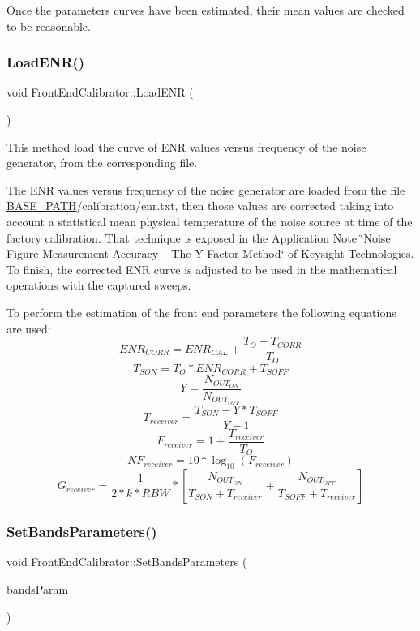 Once the parameters\textquotesingle{} curves have been estimated, their mean values are checked to be reasonable. \mbox{\label{classFrontEndCalibrator_af166e90f4fe0dfd7cdf825b88d33a479}} 
\subsubsection{\texorpdfstring{Load\+E\+N\+R()}{LoadENR()}}
{\footnotesize\ttfamily void Front\+End\+Calibrator\+::\+Load\+E\+NR (\begin{DoxyParamCaption}{ }\end{DoxyParamCaption})}



This method load the curve of E\+NR values versus frequency of the noise generator, from the corresponding file. 

The E\+NR values versus frequency of the noise generator are loaded from the file \hyperlink{Basics_8h_a0423f4cb393331ce0b9f6b3a43adcaae}{B\+A\+S\+E\+\_\+\+P\+A\+TH}/calibration/enr.txt, then those values are corrected taking into account a statistical mean physical temperature of the noise source at time of the factory calibration. That technique is exposed in the Application Note \char`\"{}\+Noise Figure Measurement Accuracy – The Y-\/\+Factor
\+Method\char`\"{} of Keysight Technologies. To finish, the corrected E\+NR curve is adjusted to be used in the mathematical operations with the captured sweeps.

To perform the estimation of the front end parameters the following equations are used\+: \[ ENR_{CORR}=ENR_{CAL}+\frac{T_{O}-T_{CORR}}{T_{O}} \] \[ T_{SON}=T_{O}*ENR_{CORR}+T_{SOFF} \] \[ Y=\frac{N_{OUT_{ON}}}{N_{OUT_{OFF}}} \] \[ T_{receiver}=\frac{T_{SON}-Y*T_{SOFF}}{Y-1} \] \[ F_{receiver}=1+\frac{T_{receiver}}{T_O} \] \[ NF_{receiver}=10*\log_{10}(F_{receiver}) \] \[ G_{receiver}=\frac{1}{2*k*RBW}*\left[\frac{N_{OUT_{ON}}}{T_{SON}+T_{receiver}}+\frac{N_{OUT_{OFF}}}{T_{SOFF}+T_{receiver}}\right] \] \mbox{\label{classFrontEndCalibrator_a6fcf8e8343878614d1b03910bb97a3d6}} 
\subsubsection{\texorpdfstring{Set\+Bands\+Parameters()}{SetBandsParameters()}}
{\footnotesize\ttfamily void Front\+End\+Calibrator\+::\+Set\+Bands\+Parameters (\begin{DoxyParamCaption}\item[{const std\+::vector$<$ \hyperlink{structBandParameters}{Band\+Parameters} $>$ \&}]{bands\+Param }\end{DoxyParamCaption})}



